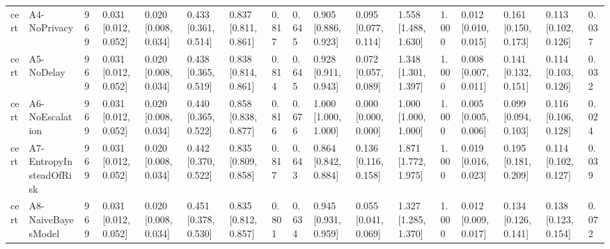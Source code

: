 \begin{table}[!ht]
{\begin{tabular}{lllllllllllllllll}
cert & A4-NoPrivacy & 969 & 0.031 [0.012, 0.052] & 0.020 [0.008, 0.034] & 0.433 [0.361, 0.514] & 0.837 [0.811, 0.861] & 0.817 & 0.645 & 0.905 [0.886, 0.923] & 0.095 [0.077, 0.114] & 1.558 [1.488, 1.630] & 1.000 & 0.012 [0.010, 0.015] & 0.161 [0.150, 0.173] & 0.113 [0.102, 0.126] & 0.037 \\
cert & A5-NoDelay & 969 & 0.031 [0.012, 0.052] & 0.020 [0.008, 0.034] & 0.438 [0.365, 0.519] & 0.838 [0.814, 0.861] & 0.814 & 0.645 & 0.928 [0.911, 0.943] & 0.072 [0.057, 0.089] & 1.348 [1.301, 1.397] & 1.000 & 0.008 [0.007, 0.011] & 0.141 [0.132, 0.151] & 0.114 [0.103, 0.126] & 0.032 \\
cert & A6-NoEscalation & 969 & 0.031 [0.012, 0.052] & 0.020 [0.008, 0.034] & 0.440 [0.365, 0.522] & 0.858 [0.838, 0.877] & 0.816 & 0.676 & 1.000 [1.000, 1.000] & 0.000 [0.000, 0.000] & 1.000 [1.000, 1.000] & 1.000 & 0.005 [0.005, 0.006] & 0.099 [0.094, 0.103] & 0.116 [0.106, 0.128] & 0.024 \\
cert & A7-EntropyInsteadOfRisk & 969 & 0.031 [0.012, 0.052] & 0.020 [0.008, 0.034] & 0.442 [0.370, 0.522] & 0.835 [0.809, 0.858] & 0.817 & 0.643 & 0.864 [0.842, 0.884] & 0.136 [0.116, 0.158] & 1.871 [1.772, 1.975] & 1.000 & 0.019 [0.016, 0.023] & 0.195 [0.181, 0.209] & 0.114 [0.102, 0.127] & 0.039 \\
cert & A8-NaiveBayesModel & 969 & 0.031 [0.012, 0.052] & 0.020 [0.008, 0.034] & 0.451 [0.378, 0.530] & 0.835 [0.812, 0.857] & 0.801 & 0.634 & 0.945 [0.931, 0.959] & 0.055 [0.041, 0.069] & 1.327 [1.285, 1.370] & 1.000 & 0.012 [0.009, 0.017] & 0.134 [0.126, 0.141] & 0.138 [0.123, 0.154] & 0.072 \\
\bottomrule
\end{tabular}}
\end{table}
